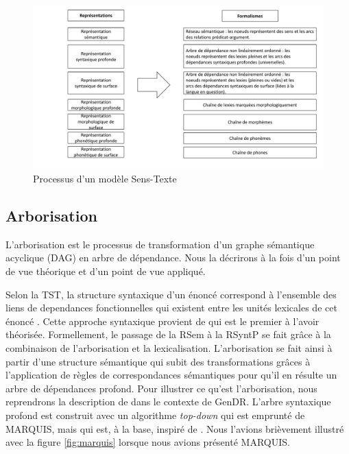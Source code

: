 \begin{figure}[htb]
	\centering
	\includegraphics[width=1\textwidth, trim = {0cm 0cm 0cm 0cm},clip]{ch3/figs/polguere2.pdf}
	\caption{Processus d'un modèle Sens-Texte \citep{PolgueretheorieSensTexte1998}}
	\label{fig:processustst}
\end{figure}


\subsection{Arborisation}\label{sec:arbo}

L'arborisation est le processus de transformation d'un graphe sémantique acyclique (DAG) en arbre de dépendance. Nous la décrirons à la fois d'un point de vue théorique et d'un point de vue appliqué.

Selon la \ac{TST}, la structure syntaxique d'un énoncé correspond à l'ensemble des liens de dependances fonctionnelles qui existent entre les unités lexicales de cet énoncé \citep{melcuk1988}. Cette approche syntaxique provient de \cite{TesniereElementssyntaxestructurale1965} qui est le premier à l'avoir théorisée. Formellement, le passage de la \ac{RSem} à la \ac{RSyntP} se fait grâce à la combinaison de l'arborisation et la lexicalisation. L'arborisation se fait ainsi à partir d'une structure sémantique qui subit des transformations grâces à l'application de règles de correspondances sémantiques pour qu'il en résulte un arbre de dépendances profond. Pour illustrer ce qu'est l'arborisation, nous reprendrons la description de \cite{lareau18} dans le contexte de GenDR. L'arbre syntaxique profond est construit avec un algorithme \emph{top-down} qui est emprunté de MARQUIS, mais qui est, à la base, inspiré de \cite{PolguereStructurationmisejeu1990}. Nous l'avions brièvement illustré avec la figure \ref{fig:marquis} lorsque nous avions présenté MARQUIS.

